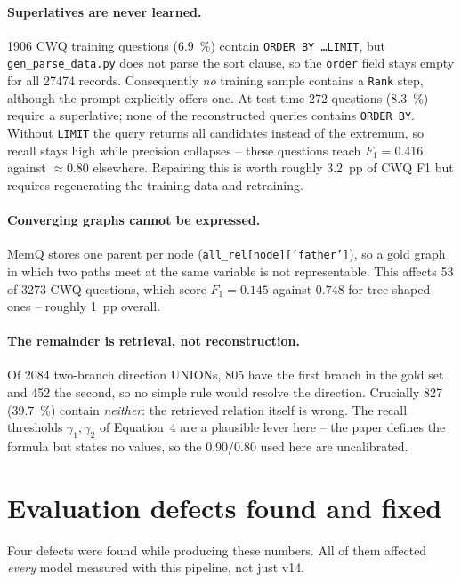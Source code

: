 \documentclass[11pt,a4paper]{article}
\begin{document}
\paragraph{Superlatives are never learned.}
\num{1906} CWQ training questions (\SI{6.9}{\percent}) contain
\texttt{ORDER BY \ldots LIMIT}, but \texttt{gen\_parse\_data.py} does not parse
the sort clause, so the \texttt{order} field stays empty for all \num{27474}
records. Consequently \emph{no} training sample contains a \texttt{Rank} step,
although the prompt explicitly offers one. At test time \num{272} questions
(\SI{8.3}{\percent}) require a superlative; none of the reconstructed queries
contains \texttt{ORDER BY}. Without \texttt{LIMIT} the query returns all
candidates instead of the extremum, so recall stays high while precision
collapses -- these questions reach \(F_1 = 0.416\) against \(\approx 0.80\)
elsewhere. Repairing this is worth roughly \SI{3.2}{pp} of CWQ F1 but requires
regenerating the training data and retraining.

\paragraph{Converging graphs cannot be expressed.}
MemQ stores one parent per node (\texttt{all\_rel[node]['father']}), so a gold
graph in which two paths meet at the same variable is not representable. This
affects \num{53} of \num{3273} CWQ questions, which score \(F_1 = 0.145\)
against \(0.748\) for tree-shaped ones -- roughly \SI{1}{pp} overall.

\paragraph{The remainder is retrieval, not reconstruction.}
Of \num{2084} two-branch direction UNIONs, \num{805} have the first branch in
the gold set and \num{452} the second, so no simple rule would resolve the
direction. Crucially \num{827} (\SI{39.7}{\percent}) contain \emph{neither}:
the retrieved relation itself is wrong. The recall thresholds
\(\gamma_1, \gamma_2\) of Equation~4 are a plausible lever here -- the paper
defines the formula but states no values, so the 0.90/0.80 used here are
uncalibrated.

\section{Evaluation defects found and fixed}
\label{sec:defects}

Four defects were found while producing these numbers. All of them affected
\emph{every} model measured with this pipeline, not just v14.
\end{document}
